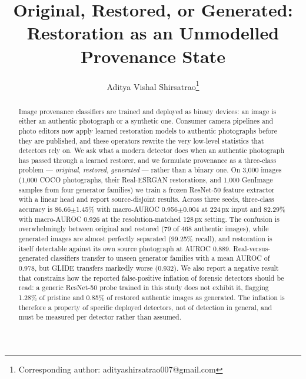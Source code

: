\documentclass[runningheads]{llncs}
\begin{document}
\title{Original, Restored, or Generated:\\Restoration as an Unmodelled Provenance State}

\author{Aditya Vishal Shirsatrao\thanks{Corresponding author: adityashirsatrao007@gmail.com}}

\maketitle

\begin{abstract}
Image provenance classifiers are trained and deployed as binary devices: an image
is either an authentic photograph or a synthetic one. Consumer camera pipelines and
photo editors now apply learned restoration models to authentic photographs before
they are published, and these operators rewrite the very low-level statistics that
detectors rely on. We ask what a modern detector does when an authentic photograph
has passed through a learned restorer, and we formulate provenance as a three-class
problem --- \emph{original}, \emph{restored}, \emph{generated} --- rather than a
binary one. On 3{,}000 images (1{,}000 COCO photographs, their Real-ESRGAN
restorations, and 1{,}000 GenImage samples from four generator families) we train a
frozen ResNet-50 feature extractor with a linear head and report source-disjoint
results. Across three seeds, three-class accuracy is 86.66$\pm$1.45\% with
macro-AUROC 0.956$\pm$0.004 at 224\,px input and 82.29\% with macro-AUROC
0.926 at the resolution-matched 128\,px setting. The
confusion is overwhelmingly between original and restored (79 of 468 authentic
images), while generated images are almost perfectly separated (99.25\% recall), and
restoration is itself detectable against its own source photograph at AUROC 0.889.
Real-versus-generated classifiers transfer to unseen generator families with a mean
AUROC of 0.978, but GLIDE transfers markedly worse (0.932). We also report a
negative result that constrains how the reported false-positive inflation of
forensic detectors should be read: a generic ResNet-50 probe trained in this study
does not exhibit it, flagging 1.28\% of pristine and 0.85\% of restored authentic
images as generated. The inflation is therefore a property of specific deployed
detectors, not of detection in general, and must be measured per detector rather
than assumed.

\end{abstract}
\end{document}
